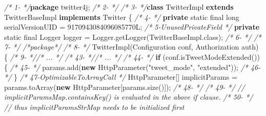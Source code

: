 \documentclass[
]{article}
\newenvironment{Shaded}{\begin{snugshade}}{\end{snugshade}}
\newcommand{\BuiltInTok}[1]{#1}
\newcommand{\CommentTok}[1]{\textcolor[rgb]{0.56,0.35,0.01}{\textit{#1}}}
\newcommand{\DataTypeTok}[1]{\textcolor[rgb]{0.13,0.29,0.53}{#1}}
\newcommand{\DecValTok}[1]{\textcolor[rgb]{0.00,0.00,0.81}{#1}}
\newcommand{\FunctionTok}[1]{\textcolor[rgb]{0.00,0.00,0.00}{#1}}
\newcommand{\ImportTok}[1]{#1}
\newcommand{\KeywordTok}[1]{\textcolor[rgb]{0.13,0.29,0.53}{\textbf{#1}}}
\newcommand{\NormalTok}[1]{#1}
\newcommand{\StringTok}[1]{\textcolor[rgb]{0.31,0.60,0.02}{#1}}
\begin{document}
\newpage

\begin{landscape}

\footnotesize

\begin{Shaded}
\begin{Highlighting}[]
\CommentTok{/*  1-                                   */}\KeywordTok{package}\ImportTok{ twitter4j;}
\CommentTok{/*  2-                                   */}
\CommentTok{/*  3-                                   */}\KeywordTok{class}\NormalTok{ TwitterImpl }\KeywordTok{extends}\NormalTok{ TwitterBaseImpl }\KeywordTok{implements}\NormalTok{ Twitter \{}
\CommentTok{/*  4-                                   */}    \KeywordTok{private} \DataTypeTok{static} \DataTypeTok{final} \DataTypeTok{long}\NormalTok{ serialVersionUID = }\DecValTok{9170943084096085770L}\NormalTok{;}
\CommentTok{/*  5-UnusedPrivateField                 */}    \KeywordTok{private} \DataTypeTok{static} \DataTypeTok{final} \BuiltInTok{Logger}\NormalTok{ logger = }\BuiltInTok{Logger}\NormalTok{.}\FunctionTok{getLogger}\NormalTok{(TwitterBaseImpl.}\FunctionTok{class}\NormalTok{);}
\CommentTok{/*  6-                                   */}    
\CommentTok{/*  7-                                   */}    \CommentTok{/*package*/}
\CommentTok{/*  8-                                   */}    \FunctionTok{TwitterImpl}\NormalTok{(}\BuiltInTok{Configuration}\NormalTok{ conf, Authorization auth) \{}
\CommentTok{/*  9-                                   *//* ...  */}
\CommentTok{/* 43-                                   *//* ...  */}
\CommentTok{/* 44-                                   */}            \KeywordTok{if}\NormalTok{ (conf.}\FunctionTok{isTweetModeExtended}\NormalTok{()) \{}
\CommentTok{/* 45-                                   */}\NormalTok{                params.}\FunctionTok{add}\NormalTok{(}\KeywordTok{new} \FunctionTok{HttpParameter}\NormalTok{(}\StringTok{"tweet_mode"}\NormalTok{, }\StringTok{"extended"}\NormalTok{));}
\CommentTok{/* 46-                                   */}\NormalTok{            \}}
\CommentTok{/* 47-OptimizableToArrayCall             */}\NormalTok{            HttpParameter[] implicitParams = params.}\FunctionTok{toArray}\NormalTok{(}\KeywordTok{new}\NormalTok{ HttpParameter[params.}\FunctionTok{size}\NormalTok{()]);}
\CommentTok{/* 48-                                   */}
\CommentTok{/* 49-                                   */}            \CommentTok{// implicitParamsMap.containsKey() is evaluated in the above if clause.}
\CommentTok{/* 50-                                   */}            \CommentTok{// thus implicitParamsStrMap needs to be initialized first}

\end{Highlighting}
\end{Shaded}
\end{landscape}
\end{document}
